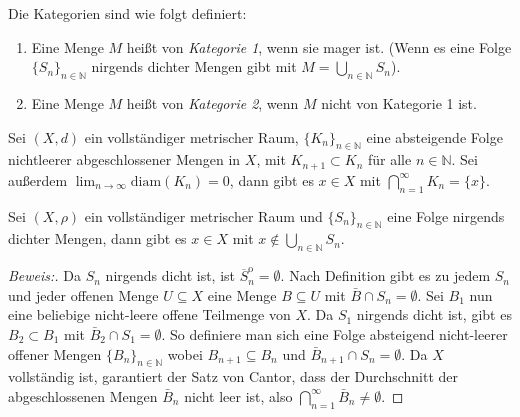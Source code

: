 \begin{rem} Die Kategorien sind wie folgt definiert: 
	\begin{enumerate} 
		\item Eine Menge $M$ heißt von \textit{Kategorie 1}, wenn sie mager ist. (Wenn es eine Folge $\{S_n\}_{n \in \mathbb{N}}$ nirgends dichter Mengen gibt mit $M = \bigcup_{n \in \mathbb{N}} S_n$).
		\item Eine Menge $M$ heißt von \textit{Kategorie 2}, wenn $M$ nicht von Kategorie 1 ist.
	\end{enumerate}
\end{rem}

\begin{theorem} \label{Cantor} 
	Sei $(X, d)$ ein vollständiger metrischer Raum, $\{K_n\}_{n \in \mathbb{N}}$ eine absteigende Folge nichtleerer abgeschlossener Mengen in $X$, mit $K_{n+1} \subset K_n$ für alle $n \in \mathbb{N}$. Sei außerdem $\lim_{n \to \infty} \text{diam}(K_n) = 0$, dann gibt es $x \in X$ mit $\bigcap_{n = 1}^{\infty} K_n = \{x\}$.
\end{theorem}

\begin{theorem} \label{baire_kat}
	Sei $(X, \rho)$ ein vollständiger metrischer Raum und $\{S_n\}_{n \in \mathbb{N}}$ eine Folge nirgends dichter Mengen, dann gibt es $x \in X$ mit $x \notin \bigcup_{n \in \mathbb{N}} S_n$.
	
	\begin{proof}[Beweis:] 
		Da $S_n$ nirgends dicht ist, ist $\overline S_n^{\mathrm{o}} = \emptyset$. Nach Definition gibt es zu jedem $S_n$ und jeder offenen Menge $U \subseteq X$ eine Menge $B \subseteq U$ mit $\bar{B} \cap S_n = \emptyset$. Sei $B_1$ nun eine beliebige nicht-leere offene Teilmenge von $X$. Da $S_1$ nirgends dicht ist, gibt es $B_2 \subset B_1$ mit $\bar{B}_2 \cap S_1 = \emptyset$. So definiere man sich eine Folge absteigend nicht-leerer offener Mengen $\{B_n\}_{n \in \mathbb{N}}$ wobei $B_{n+1} \subseteq B_n$ und $\bar{B}_{n+1} \cap S_n = \emptyset$. Da $X$ vollständig ist, garantiert der Satz von Cantor, dass der Durchschnitt der abgeschlossenen Mengen $\bar{B}_n$ nicht leer ist, also $\bigcap_{n = 1}^{\infty} \bar{B}_n \not= \emptyset$. 
	\end{proof}
\end{theorem}

